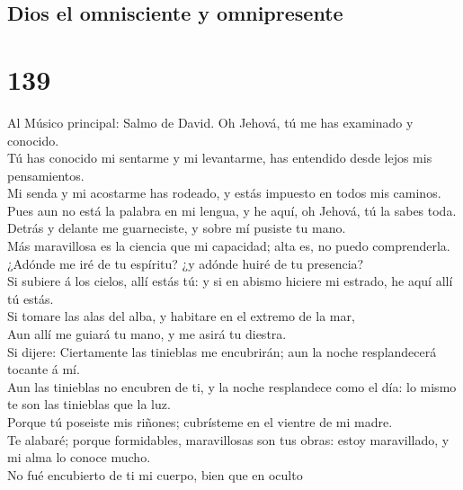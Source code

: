 \hypertarget{dios-el-omnisciente-y-omnipresente}{%
\subsection{Dios el omnisciente y
omnipresente}\label{dios-el-omnisciente-y-omnipresente}}

\hypertarget{section-138}{%
\section{139}\label{section-138}}

 Al Músico principal: Salmo de David. Oh Jehová, tú me has
examinado y conocido.\\
 Tú has conocido mi sentarme y mi levantarme, has
entendido desde lejos mis pensamientos.\\
 Mi senda y mi acostarme has rodeado, y estás impuesto en
todos mis caminos.\\
 Pues aun no está la palabra en mi lengua, y he aquí, oh
Jehová, tú la sabes toda.\\
 Detrás y delante me guarneciste, y sobre mí pusiste tu
mano.\\
 Más maravillosa es la ciencia que mi capacidad; alta es,
no puedo comprenderla.\\
 ¿Adónde me iré de tu espíritu? ¿y adónde huiré de tu
presencia?\\
 Si subiere á los cielos, allí estás tú: y si en abismo
hiciere mi estrado, he aquí allí tú estás.\\
 Si tomare las alas del alba, y habitare en el extremo de
la mar,\\
 Aun allí me guiará tu mano, y me asirá tu diestra.\\
 Si dijere: Ciertamente las tinieblas me encubrirán; aun
la noche resplandecerá tocante á mí.\\
 Aun las tinieblas no encubren de ti, y la noche
resplandece como el día: lo mismo te son las tinieblas que la luz.\\
 Porque tú poseiste mis riñones; cubrísteme en el vientre
de mi madre.\\
 Te alabaré; porque formidables, maravillosas son tus
obras: estoy maravillado, y mi alma lo conoce mucho.\\
 No fué encubierto de ti mi cuerpo, bien que en oculto
